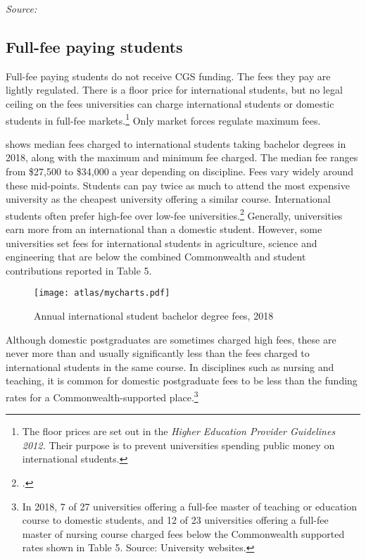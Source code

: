 \documentclass{grattan}
\begin{document}
\emph{Source:} \textcite[][]{DepartmentofEducationandTraining2017undergraduateappli}

%
\subsection{Full-fee paying students}\label{subsec:full-fee-paying-students}

Full-fee paying students do not receive CGS funding. The fees they pay are lightly regulated. There is a floor price for international students, but no legal ceiling on the fees universities can charge international students or domestic students in full-fee markets.\footnote{The floor prices are set out in the \emph{Higher Education Provider Guidelines 2012.} Their purpose is to prevent universities spending public money on international students.} Only market forces regulate maximum fees.

 shows median fees charged to international students taking bachelor degrees in 2018, along with the maximum and minimum fee charged. The median fee ranges from \$27,500 to \$34,000 a year depending on discipline. Fees vary widely around these mid-points. Students can pay twice as much to attend the most expensive university as the cheapest university offering a similar course. International students often prefer high-fee over low-fee universities.\footcite[][chapter~2]{Norton2015universityfeeswh} Generally, universities earn more from an international than a domestic student. However, some universities set fees for international students in agriculture, science and engineering that are below the combined Commonwealth and student contributions reported in Table 5.


    \begin{figure} %
    \caption{Annual international student bachelor degree fees, 2018}\label{fig:annual-international-student-bachelor-degree-fees-2018}
    \texttt{[image: atlas/mycharts.pdf]}
    \end{figure}



Although domestic postgraduates are sometimes charged high fees, these are never more than and usually significantly less than the fees charged to international students in the same course. In disciplines such as nursing and teaching, it is common for domestic postgraduate fees to be less than the funding rates for a Commonwealth-supported place.\footnote{In 2018, 7 of 27 universities offering a full-fee master of teaching or education course to domestic students, and 12 of 23 universities offering a full-fee master of nursing course charged fees below the Commonwealth supported rates shown in Table 5. Source: University websites.}
\end{document}
